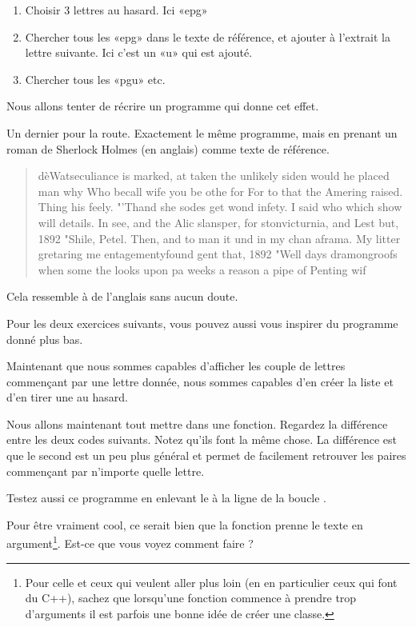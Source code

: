 \begin{enumerate}
    \item
        Choisir 3 lettres au hasard. Ici «epg» 
    \item
        Chercher tous les «epg» dans le texte de référence, et ajouter à l'extrait la lettre suivante. Ici c'est un «u» qui est ajouté.
    \item
        Chercher tous les «pgu» etc.
\end{enumerate}

Nous allons tenter de récrire un programme qui donne cet effet.


Un dernier pour la route. Exactement le même programme, mais en prenant un roman de Sherlock Holmes (en anglais) comme texte de référence.
\begin{quote}
dèWatseculiance is marked, at taken the unlikely siden would he placed man why Who becall wife you be othe for For to that the Amering raised. Thing his feely. "'Thand she sodes get wond infety. I said who which show will details. In see, and the Alic slansper, for stonvicturnia, and Lest but, 1892 "Shile, Petel. Then, and to man it und in my chan aframa. My litter gretaring me entagementyfound gent that, 1892 "Well days dramongroofs when some the looks upon pa weeks a reason a pipe of Penting wif
\end{quote}
Cela ressemble à de l'anglais sans aucun doute.

Pour les deux exercices suivants, vous pouvez aussi vous inspirer du programme  donné plus bas.

Maintenant que nous sommes capables d'afficher les couple de lettres commençant par une lettre donnée, nous sommes capables d'en créer la liste et d'en tirer une au hasard.


Nous allons maintenant tout mettre dans une fonction. Regardez la différence entre les deux codes suivants. Notez qu'ils font la même chose. La différence est que le second est un peu plus général et permet de facilement retrouver les paires commençant par n'importe quelle lettre.



Testez aussi ce programme en enlevant le \info{[1:]} à la ligne de la boucle .



Pour être vraiment cool, ce serait bien que la fonction  prenne le texte en argument\footnote{Pour celle et ceux qui veulent aller plus loin (en en particulier ceux qui font du C++), sachez que lorsqu'une fonction commence à prendre trop d'arguments il est parfois une bonne idée de créer une classe.}. Est-ce que vous voyez comment faire ?

